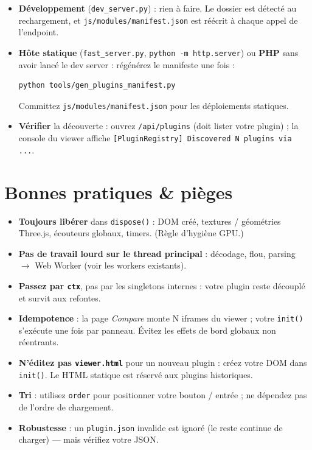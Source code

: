 \documentclass[11pt,a4paper]{article}
\newcommand{\code}[1]{\texttt{#1}}
\newcommand{\filepath}[1]{\texttt{\small #1}}
\begin{document}
\begin{itemize}[leftmargin=1.5em]
  \item \textbf{Développement} (\filepath{dev\_server.py}) : rien à faire. Le
        dossier est détecté au rechargement, et \filepath{js/modules/manifest.json}
        est réécrit à chaque appel de l'endpoint.
  \item \textbf{Hôte statique} (\filepath{fast\_server.py},
        \code{python -m http.server}) ou \textbf{PHP} sans avoir lancé le dev
        server : régénérez le manifeste une fois :
\begin{lstlisting}[language=bash]
python tools/gen_plugins_manifest.py
\end{lstlisting}
        Committez \filepath{js/modules/manifest.json} pour les déploiements
        statiques.
  \item \textbf{Vérifier} la découverte : ouvrez \code{/api/plugins} (doit lister
        votre plugin) ; la console du viewer affiche
        \code{[PluginRegistry] Discovered N plugins via ...}.
\end{itemize}

\section{Bonnes pratiques \& pièges}

\begin{itemize}[leftmargin=1.5em]
  \item \textbf{Toujours libérer} dans \code{dispose()} : DOM créé, textures /
        géométries Three.js, écouteurs globaux, timers. (Règle d'hygiène GPU.)
  \item \textbf{Pas de travail lourd sur le thread principal} : décodage, flou,
        parsing $\rightarrow$ Web Worker (voir les workers existants).
  \item \textbf{Passez par \code{ctx}}, pas par les singletons internes : votre
        plugin reste découplé et survit aux refontes.
  \item \textbf{Idempotence} : la page \emph{Compare} monte N iframes du viewer ;
        votre \code{init()} s'exécute une fois par panneau. Évitez les effets de
        bord globaux non réentrants.
  \item \textbf{N'éditez pas \filepath{viewer.html}} pour un nouveau plugin :
        créez votre DOM dans \code{init()}. Le HTML statique est réservé aux
        plugins historiques.
  \item \textbf{Tri} : utilisez \code{order} pour positionner votre bouton /
        entrée ; ne dépendez pas de l'ordre de chargement.
  \item \textbf{Robustesse} : un \filepath{plugin.json} invalide est ignoré
        (le reste continue de charger) --- mais vérifiez votre JSON.
\end{itemize}
\end{document}
